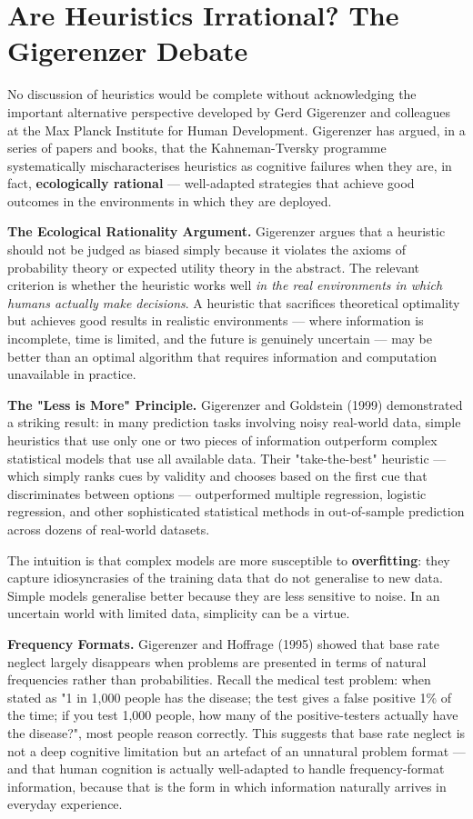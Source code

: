 \documentclass[12pt, letterpaper]{article}
\begin{document}
\medskip


\section{Are Heuristics Irrational? The Gigerenzer Debate}


No discussion of heuristics would be complete without acknowledging the important alternative perspective developed by Gerd Gigerenzer and colleagues at the Max Planck Institute for Human Development. Gigerenzer has argued, in a series of papers and books, that the Kahneman-Tversky programme systematically mischaracterises heuristics as cognitive failures when they are, in fact, \textbf{ecologically rational} --- well-adapted strategies that achieve good outcomes in the environments in which they are deployed.

\textbf{The Ecological Rationality Argument.} Gigerenzer argues that a heuristic should not be judged as biased simply because it violates the axioms of probability theory or expected utility theory in the abstract. The relevant criterion is whether the heuristic works well \textit{in the real environments in which humans actually make decisions}. A heuristic that sacrifices theoretical optimality but achieves good results in realistic environments --- where information is incomplete, time is limited, and the future is genuinely uncertain --- may be better than an optimal algorithm that requires information and computation unavailable in practice.

\textbf{The "Less is More" Principle.} Gigerenzer and Goldstein (1999) demonstrated a striking result: in many prediction tasks involving noisy real-world data, simple heuristics that use only one or two pieces of information outperform complex statistical models that use all available data. Their "take-the-best" heuristic --- which simply ranks cues by validity and chooses based on the first cue that discriminates between options --- outperformed multiple regression, logistic regression, and other sophisticated statistical methods in out-of-sample prediction across dozens of real-world datasets.

The intuition is that complex models are more susceptible to \textbf{overfitting}: they capture idiosyncrasies of the training data that do not generalise to new data. Simple models generalise better because they are less sensitive to noise. In an uncertain world with limited data, simplicity can be a virtue.

\textbf{Frequency Formats.} Gigerenzer and Hoffrage (1995) showed that base rate neglect largely disappears when problems are presented in terms of natural frequencies rather than probabilities. Recall the medical test problem: when stated as "1 in 1,000 people has the disease; the test gives a false positive 1\% of the time; if you test 1,000 people, how many of the positive-testers actually have the disease?", most people reason correctly. This suggests that base rate neglect is not a deep cognitive limitation but an artefact of an unnatural problem format --- and that human cognition is actually well-adapted to handle frequency-format information, because that is the form in which information naturally arrives in everyday experience.
\end{document}
